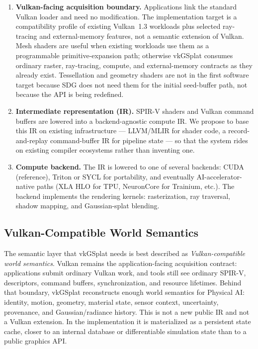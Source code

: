 \documentclass[10pt,journal,onecolumn]{IEEEtran}
\begin{document}
\begin{enumerate}
    \item \textbf{Vulkan-facing acquisition boundary.} Applications link the
    standard Vulkan loader and need no modification. The implementation target
    is a compatibility profile of existing Vulkan~1.3 workloads plus selected
    ray-tracing and external-memory features, not a semantic extension of
    Vulkan. Mesh shaders are useful when existing workloads use them as a
    programmable primitive-expansion path; otherwise vkGSplat consumes ordinary
    raster, ray-tracing, compute, and external-memory contracts as they already
    exist. Tessellation and geometry shaders are not in the first software
    target because SDG does not need them for the initial seed-buffer path, not
    because the API is being redefined.

    \item \textbf{Intermediate representation (IR).} SPIR-V shaders and
    Vulkan command buffers are lowered into a backend-agnostic compute
    IR. We propose to base this IR on existing infrastructure ---
    LLVM\slash MLIR for shader code, a record-and-replay command-buffer
    IR for pipeline state --- so that the system rides on existing
    compiler ecosystems rather than inventing one.

    \item \textbf{Compute backend.} The IR is lowered to one of several
    backends: CUDA (reference), Triton or SYCL for portability, and
    eventually AI-accelerator-native paths (XLA HLO for TPU, NeuronCore
    for Trainium, etc.). The backend implements the rendering kernels:
    rasterization, ray traversal, shadow mapping, and
    Gaussian-splat blending.
\end{enumerate}

\subsection{Vulkan-Compatible World Semantics}
\label{sec:vulkan-world-semantics}

The semantic layer that vkGSplat needs is best described as
\emph{Vulkan-compatible world semantics}. Vulkan remains the application-facing
acquisition contract: applications submit ordinary Vulkan work, and tools still
see ordinary SPIR-V, descriptors, command buffers, synchronization, and resource
lifetimes. Behind that boundary, vkGSplat reconstructs enough world semantics
for Physical AI: identity, motion, geometry, material state, sensor context,
uncertainty, provenance, and Gaussian/radiance history. This is not a new
public IR and not a Vulkan extension. In the implementation it is materialized
as a persistent state cache, closer to an internal database or differentiable
simulation state than to a public graphics API.
\end{document}
